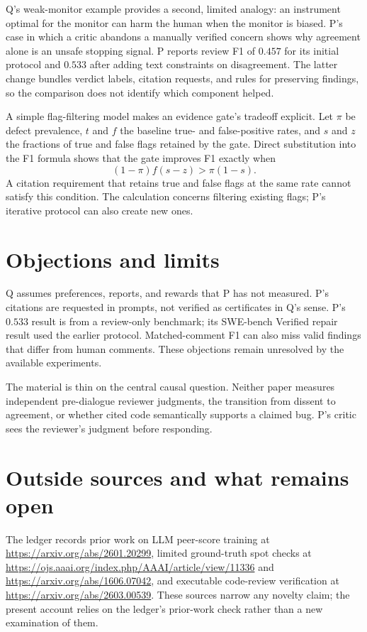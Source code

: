 \documentclass{article}
\begin{document}
Q's weak-monitor example provides a second, limited analogy: an instrument optimal for the monitor can harm the human when the monitor is biased. P's case in which a critic abandons a manually verified concern shows why agreement alone is an unsafe stopping signal. P reports review F1 of \(0.457\) for its initial protocol and \(0.533\) after adding text constraints on disagreement. The latter change bundles verdict labels, citation requests, and rules for preserving findings, so the comparison does not identify which component helped. 

A simple flag-filtering model makes an evidence gate's tradeoff explicit. Let \(\pi\) be defect prevalence, \(t\) and \(f\) the baseline true- and false-positive rates, and \(s\) and \(z\) the fractions of true and false flags retained by the gate. Direct substitution into the F1 formula shows that the gate improves F1 exactly when
\[
(1-\pi)f(s-z)>\pi(1-s).
\]
A citation requirement that retains true and false flags at the same rate cannot satisfy this condition. The calculation concerns filtering existing flags; P's iterative protocol can also create new ones. 

\section*{Objections and limits}

Q assumes preferences, reports, and rewards that P has not measured. P's citations are requested in prompts, not verified as certificates in Q's sense. P's \(0.533\) result is from a review-only benchmark; its SWE-bench Verified repair result used the earlier protocol. Matched-comment F1 can also miss valid findings that differ from human comments. These objections remain unresolved by the available experiments. 

The material is thin on the central causal question. Neither paper measures independent pre-dialogue reviewer judgments, the transition from dissent to agreement, or whether cited code semantically supports a claimed bug. P's critic sees the reviewer's judgment before responding. 

\section*{Outside sources and what remains open}

The ledger records prior work on LLM peer-score training at \url{https://arxiv.org/abs/2601.20299}, limited ground-truth spot checks at \url{https://ojs.aaai.org/index.php/AAAI/article/view/11336} and \url{https://arxiv.org/abs/1606.07042}, and executable code-review verification at \url{https://arxiv.org/abs/2603.00539}. These sources narrow any novelty claim; the present account relies on the ledger's prior-work check rather than a new examination of them. 
\end{document}
